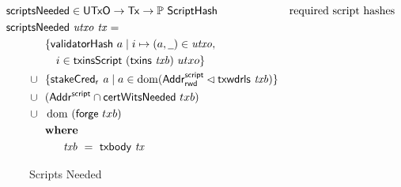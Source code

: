 \begin{figure}[htb]
  \begin{align*}
    & \hspace{-1cm}\fun{scriptsNeeded} \in \UTxO \to \Tx \to
      \powerset{\ScriptHash}
    & \text{required script hashes} \\
    &  \hspace{-1cm}\fun{scriptsNeeded}~\var{utxo}~\var{tx} = \\
    & ~~\{ \fun{validatorHash}~a \mid i \mapsto (a, \wcard) \in \var{utxo},\\
    & ~~~~~i\in\fun{txinsScript}~{(\fun{txins~\var{txb}})}~{utxo}\} \\
    \cup & ~~\{ \fun{stakeCred_{r}}~\var{a} \mid a \in \dom (\AddrRWDScr
           \restrictdom \fun{txwdrls}~\var{txb}) \} \\
      \cup & ~~(\AddrScr \cap \fun{certWitsNeeded}~{txb}) \\
      \cup & ~~\dom~(\fun{forge}~{txb}) \\
      & \where \\
      & ~~~~~~~ \var{txb}~=~\txbody{tx} \\
  \end{align*}
  \caption{Scripts Needed}
  \label{fig:functions-witnesses}
\end{figure}



\clearpage
